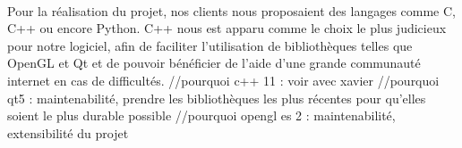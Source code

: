 \paragraph{}
        Pour la réalisation du projet, nos clients nous proposaient des langages comme C, C++ ou encore Python. C++ nous est apparu comme le choix le plus judicieux pour notre logiciel, afin de faciliter l'utilisation de bibliothèques telles que OpenGL et Qt et de pouvoir bénéficier de l'aide d'une grande communauté internet en cas de difficultés.
        //pourquoi c++ 11 : voir avec xavier
        //pourquoi qt5 : maintenabilité, prendre les bibliothèques les plus récentes pour qu'elles soient le plus durable possible
        //pourquoi opengl es 2 : maintenabilité, extensibilité du projet
